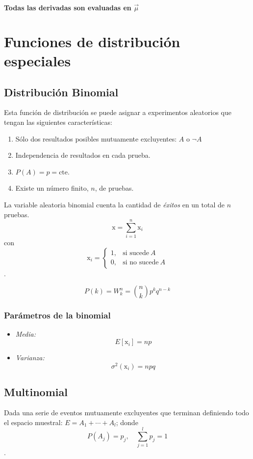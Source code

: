 \documentclass[openany]{book}
\begin{document}
\par \textbf{Todas las derivadas son evaluadas en $\vec{\mu}$}

\chapter{Funciones de distribución especiales}
\section{Distribución Binomial}
Esta función de distribución se puede asignar a experimentos aleatorios que tengan las siguientes características:
\begin{enumerate}
  \item Sólo dos resultados posibles mutuamente excluyentes: $A$ o $\lnot A$
  \item Independencia de resultados en cada prueba.
  \item $P(A)=p=\mathrm{cte}$.
  \item Existe un número finito, $n$, de pruebas.
\end{enumerate}

La variable aleatoria binomial cuenta la cantidad de \emph{éxitos} en un total de $n$ pruebas.
\begin{equation*}
  \mathrm{x}=\sum_{i=1}^{n}\mathrm{x}_{i}
\end{equation*}
con 
\begin{equation*}
  \mathrm{x}_i = \begin{cases}
    1, & \text{si sucede}~ A\\
    0, & \text{si no sucede}~ A
  \end{cases}
\end{equation*}.

\begin{equation}
  \label{eq:prob-binomial}
  P(k)=W^{n}_{k}=\binom{n}{k}p^{k}q^{n-k}
\end{equation}

\subsection{Parámetros de la binomial}
\begin{itemize}
  \item \emph{Media:}$$E\left[\mathrm{x}_i\right]=np$$
  \item \emph{Varianza:}$$\sigma^2(\mathrm{x}_{i})=npq$$
\end{itemize}

\section{Multinomial}
Dada una serie de eventos mutuamente excluyentes que terminan definiendo todo el espacio muestral: $E=A_1+\cdots+A_{l}$; donde
\begin{equation*}
  P(A_{j})=p_{j},\quad \sum_{j=1}^{l}p_{j}=1
\end{equation*}.
\end{document}
